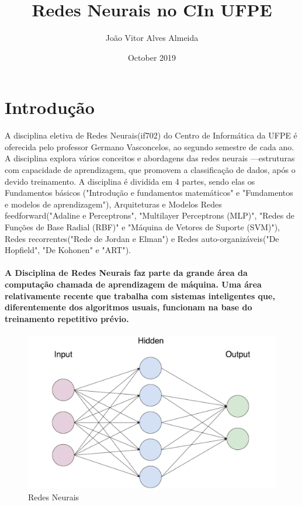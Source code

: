 \documentclass{article}
\title{Redes Neurais no CIn UFPE}
\author{João Vitor Alves Almeida }
\date{October 2019}
\begin{document}
\maketitle

\section{Introdução}
A disciplina eletiva de Redes Neurais(if702)\citep{Disciplina} do Centro de Informática da UFPE é oferecida pelo professor Germano Vasconcelos\citep{GCV}, ao segundo semestre de cada ano. A disciplina explora vários conceitos e abordagens das redes neurais —estruturas com capacidade de aprendizagem, que promovem a classificação de dados, após o devido treinamento. A disciplina é dividida em 4 partes, sendo elas os Fundamentos básicos ("Introdução e fundamentos matemáticos" e "Fundamentos e modelos de aprendizagem"), Arquiteturas e Modelos Redes feedforward("Adaline e Perceptrons", "Multilayer Perceptrons (MLP)", "Redes de Funções de Base Radial (RBF)" e "Máquina de Vetores de Suporte (SVM)"), Redes recorrentes("Rede de Jordan e Elman") e Redes auto-organizáveis("De Hopfield", "De Kohonen" e "ART")\citep{CInWiki}. 

\paragraph{
A Disciplina de Redes Neurais faz parte da grande área da computação chamada de aprendizagem de máquina. Uma área relativamente recente que trabalha com sistemas inteligentes que, diferentemente dos algoritmos usuais, funcionam na base do treinamento repetitivo prévio.    
}

\begin{figure}[h!]
\centering
\includegraphics[scale=0.2]{redes-1.png}
\caption{Redes Neurais}
\label{fig:redes-1}
\end{figure}
\end{document}
